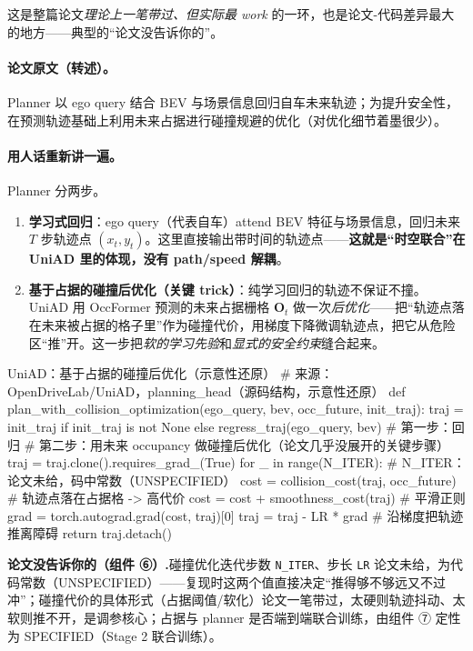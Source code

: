 这是整篇论文\emph{理论上一笔带过、但实际最 work} 的一环，也是论文-代码差异最大的地方——典型的“论文没告诉你的”。

\paragraph{论文原文（转述）。}
Planner 以 ego query 结合 BEV 与场景信息回归自车未来轨迹；为提升安全性，在预测轨迹基础上利用未来占据进行碰撞规避的优化（对优化细节着墨很少）\cite{hu2023uniad}。

\paragraph{用人话重新讲一遍。}Planner 分两步。
\begin{enumerate}
  \item \textbf{学习式回归}：ego query（代表自车）attend BEV 特征与场景信息，回归未来 $T$ 步轨迹点 $(x_t,y_t)$。这里直接输出带时间的轨迹点——\textbf{这就是“时空联合”在 UniAD 里的体现，没有 path/speed 解耦}。
  \item \textbf{基于占据的碰撞后优化（关键 trick）}：纯学习回归的轨迹不保证不撞。UniAD 用 OccFormer 预测的未来占据栅格 $\mathbf{O}_t$ 做一次\emph{后优化}——把“轨迹点落在未来被占据的格子里”作为碰撞代价，用梯度下降微调轨迹点，把它从危险区“推”开。这一步把\emph{软的学习先验}和\emph{显式的安全约束}缝合起来。
\end{enumerate}

\begin{codebox}[Python]{UniAD：基于占据的碰撞后优化（示意性还原）}
# 来源：OpenDriveLab/UniAD，planning_head（源码结构，示意性还原）
def plan_with_collision_optimization(ego_query, bev, occ_future, init_traj):
    traj = init_traj if init_traj is not None else regress_traj(ego_query, bev)  # 第一步：回归
    # 第二步：用未来 occupancy 做碰撞后优化（论文几乎没展开的关键步骤）
    traj = traj.clone().requires_grad_(True)
    for _ in range(N_ITER):                       # N_ITER：论文未给，码中常数（UNSPECIFIED）
        cost = collision_cost(traj, occ_future)   # 轨迹点落在占据格 -> 高代价
        cost = cost + smoothness_cost(traj)       # 平滑正则
        grad = torch.autograd.grad(cost, traj)[0]
        traj = traj - LR * grad                   # 沿梯度把轨迹推离障碍
    return traj.detach()
\end{codebox}

\begin{note}
\textbf{论文没告诉你的（组件 ⑥）.}\;碰撞优化迭代步数 \texttt{N\_ITER}、步长 \texttt{LR} 论文未给，为代码常数（UNSPECIFIED）——复现时这两个值直接决定“推得够不够远又不过冲”；碰撞代价的具体形式（占据阈值/软化）论文一笔带过，太硬则轨迹抖动、太软则推不开，是调参核心；占据与 planner 是否端到端联合训练，由组件 ⑦ 定性为 SPECIFIED（Stage 2 联合训练）。
\end{note}

